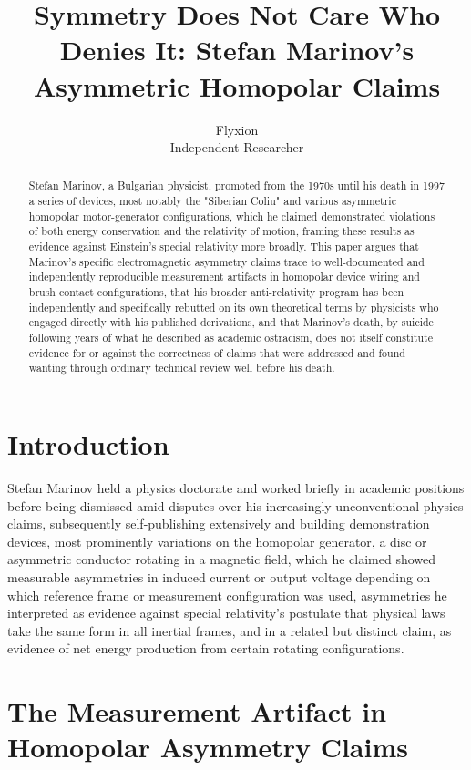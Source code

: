 \documentclass[11pt]{article}
\title{Symmetry Does Not Care Who Denies It: Stefan Marinov's Asymmetric Homopolar Claims}
\author{Flyxion \\ \small Independent Researcher}
\date{}
\begin{document}
\maketitle

\begin{abstract}
Stefan Marinov, a Bulgarian physicist, promoted from the 1970s until his death in 1997 a series of devices, most notably the "Siberian Coliu" and various asymmetric homopolar motor-generator configurations, which he claimed demonstrated violations of both energy conservation and the relativity of motion, framing these results as evidence against Einstein's special relativity more broadly. This paper argues that Marinov's specific electromagnetic asymmetry claims trace to well-documented and independently reproducible measurement artifacts in homopolar device wiring and brush contact configurations, that his broader anti-relativity program has been independently and specifically rebutted on its own theoretical terms by physicists who engaged directly with his published derivations, and that Marinov's death, by suicide following years of what he described as academic ostracism, does not itself constitute evidence for or against the correctness of claims that were addressed and found wanting through ordinary technical review well before his death.
\end{abstract}

\section{Introduction}

Stefan Marinov held a physics doctorate and worked briefly in academic positions before being dismissed amid disputes over his increasingly unconventional physics claims, subsequently self-publishing extensively and building demonstration devices, most prominently variations on the homopolar generator, a disc or asymmetric conductor rotating in a magnetic field, which he claimed showed measurable asymmetries in induced current or output voltage depending on which reference frame or measurement configuration was used, asymmetries he interpreted as evidence against special relativity's postulate that physical laws take the same form in all inertial frames, and in a related but distinct claim, as evidence of net energy production from certain rotating configurations.

\section{The Measurement Artifact in Homopolar Asymmetry Claims}
\end{document}
